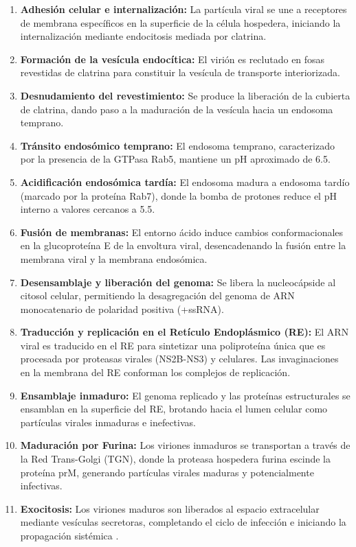 \begin{enumerate}
    \item \textbf{Adhesión celular e internalización:} La partícula viral se une a receptores de membrana específicos en la superficie de la célula hospedera, iniciando la internalización mediante endocitosis mediada por clatrina.
    \item \textbf{Formación de la vesícula endocítica:} El virión es reclutado en fosas revestidas de clatrina para constituir la vesícula de transporte interiorizada.
    \item \textbf{Desnudamiento del revestimiento:} Se produce la liberación de la cubierta de clatrina, dando paso a la maduración de la vesícula hacia un endosoma temprano.
    \item \textbf{Tránsito endosómico temprano:} El endosoma temprano, caracterizado por la presencia de la GTPasa Rab5, mantiene un pH aproximado de 6.5.
    \item \textbf{Acidificación endosómica tardía:} El endosoma madura a endosoma tardío (marcado por la proteína Rab7), donde la bomba de protones reduce el pH interno a valores cercanos a 5.5.
    \item \textbf{Fusión de membranas:} El entorno ácido induce cambios conformacionales en la glucoproteína E de la envoltura viral, desencadenando la fusión entre la membrana viral y la membrana endosómica.
    \item \textbf{Desensamblaje y liberación del genoma:} Se libera la nucleocápside al citosol celular, permitiendo la desagregación del genoma de ARN monocatenario de polaridad positiva (+ssRNA).
    \item \textbf{Traducción y replicación en el Retículo Endoplásmico (RE):} El ARN viral es traducido en el RE para sintetizar una poliproteína única que es procesada por proteasas virales (NS2B-NS3) y celulares. Las invaginaciones en la membrana del RE conforman los complejos de replicación.
    \item \textbf{Ensamblaje inmaduro:} El genoma replicado y las proteínas estructurales se ensamblan en la superficie del RE, brotando hacia el lumen celular como partículas virales inmaduras e inefectivas.
    \item \textbf{Maduración por Furina:} Los viriones inmaduros se transportan a través de la Red Trans-Golgi (TGN), donde la proteasa hospedera furina escinde la proteína prM, generando partículas virales maduras y potencialmente infectivas.
    \item \textbf{Exocitosis:} Los viriones maduros son liberados al espacio extracelular mediante vesículas secretoras, completando el ciclo de infección e iniciando la propagación sistémica \cite{screaton2015new}.
\end{enumerate}


